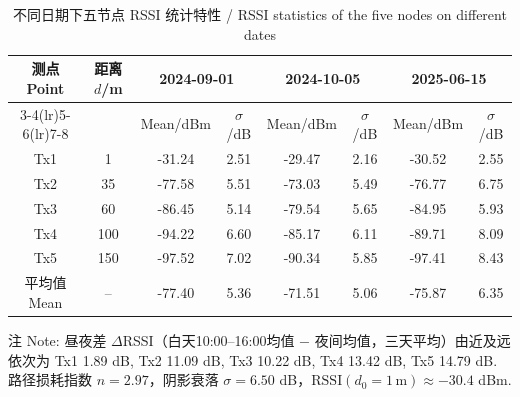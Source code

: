 \begin{table}[htbp]
  \centering
  \caption{不同日期下五节点 RSSI 统计特性 / RSSI statistics of the five nodes on different dates}
  \label{tab:rssi_stats}
  \begin{tabular}{cccccccc}
    \toprule
    \multirow{2}{*}{测点 Point} & \multirow{2}{*}{距离 $d$/m} & \multicolumn{2}{c}{2024-09-01} & \multicolumn{2}{c}{2024-10-05} & \multicolumn{2}{c}{2025-06-15} \\
    \cmidrule(lr){3-4}\cmidrule(lr){5-6}\cmidrule(lr){7-8}
    & & Mean/dBm & $\sigma$/dB & Mean/dBm & $\sigma$/dB & Mean/dBm & $\sigma$/dB \\
    \midrule
    Tx1 & 1 & -31.24 & 2.51 & -29.47 & 2.16 & -30.52 & 2.55 \\
    Tx2 & 35 & -77.58 & 5.51 & -73.03 & 5.49 & -76.77 & 6.75 \\
    Tx3 & 60 & -86.45 & 5.14 & -79.54 & 5.65 & -84.95 & 5.93 \\
    Tx4 & 100 & -94.22 & 6.60 & -85.17 & 6.11 & -89.71 & 8.09 \\
    Tx5 & 150 & -97.52 & 7.02 & -90.34 & 5.85 & -97.41 & 8.43 \\
    \midrule
    平均值 Mean & -- & -77.40 & 5.36 & -71.51 & 5.06 & -75.87 & 6.35 \\
    \bottomrule
  \end{tabular}
  \par\vspace{2pt}
  \begin{flushleft}\small
  注 Note: 昼夜差 $\Delta$RSSI（白天10:00--16:00均值 $-$ 夜间均值，三天平均）由近及远依次为 Tx1 1.89 dB, Tx2 11.09 dB, Tx3 10.22 dB, Tx4 13.42 dB, Tx5 14.79 dB. 
  路径损耗指数 $n=2.97$，阴影衰落 $\sigma=6.50$ dB，$\mathrm{RSSI}(d_0{=}1\,\mathrm{m})\approx-30.4$ dBm.
  \end{flushleft}
\end{table}